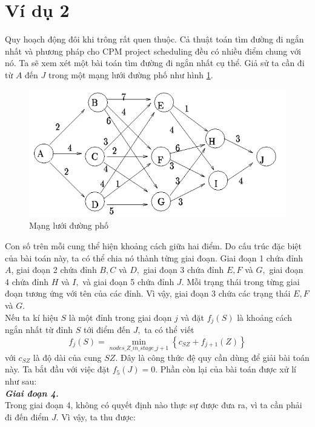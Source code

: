 \documentclass[12pt,a4paper]{article}
\begin{document}
\section{Ví dụ 2}
Quy hoạch động đôi khi trông rất quen thuộc. Cả thuật toán tìm đường đi ngắn nhất và phương pháp cho CPM project scheduling đều có nhiều điểm chung với nó.
Ta sẽ xem xét một bài toán tìm đường đi ngắn nhất cụ thể. Giả sử ta cần đi từ \(A\) đến \(J\) trong một mạng lưới đường phố như hình \ref{hinh2}.
\begin{center}
\begin{figure}[H]
\label{hinh2}
\includegraphics[scale=1]{hinh2}
\caption{Mạng lưới đường phố}
\end{figure}
\end{center}
Con số trên mỗi cung thể hiện khoảng cách giữa hai điểm. Do cấu trúc đặc biệt của bài toán này, ta có thể chia nó thành từng giai đoạn. Giai đoạn 1 chứa đỉnh \(A\), giai đoạn 2 chứa đỉnh \(B, C\) và \(D,\) giai đoạn 3 chứa đỉnh \(E, F\) và \(G,\) giai đoạn 4 chứa đỉnh \(H\) và \(I,\) và giai đoạn 5 chứa đỉnh \(J.\) Mỗi trạng thái trong từng giai đoạn tương ứng với tên của các đỉnh. Vì vậy, giai đoạn 3 chứa các trạng thái \(E, F\) và \(G.\)\\
Nếu ta kí hiệu \(S\) là một đỉnh trong giai đoạn \(j\) và đặt \({f_j}\left( S \right)\) là khoảng cách ngắn nhất từ đỉnh \(S\) tới điểm đến \(J,\) ta có thể viết
\[{f_j}\left( S \right) = \mathop {\min }\limits_{nodes\_Z\_in\_stage\_j + 1} \left\{ {{c_{SZ}} + {f_{j + 1}}\left( Z \right)} \right\}\]
với \({c_{SZ}}\) là độ dài của cung \(SZ.\) Đây là công thức đệ quy cần dùng để giải bài toán này. Ta bắt đầu với việc đặt \({f_5}\left( J \right) = 0.\) Phần còn lại của bài toán được xử lí như sau:\\
\textbf{\textit{Giai đoạn 4.}}\\
Trong giai đoạn 4, không có quyết định nào thực sự được đưa ra, vì ta cần phải đi đến điểm \(J.\) Vì vậy, ta thu được:
\end{document}
